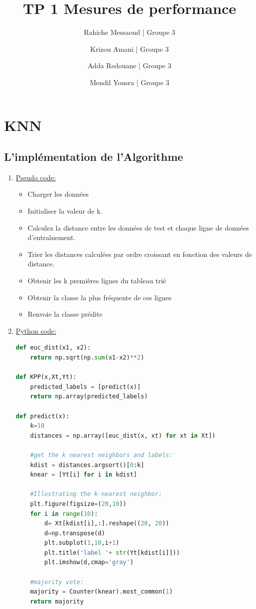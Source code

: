 \documentclass[12pt,a4paper]{article}
\title{TP 1 Mesures de performance}
\author{Rahiche Messaoud | Groupe 3 \and Krizou Amani | Groupe 3 \and Adda Redouane | Groupe 3 \and Mendil Yousra | Groupe 3 }
\date{ }
\begin{document}
\maketitle
\newpage
\tableofcontents

\newpage
\section{KNN}
\subsection{L'implémentation de l'Algorithme}
\begin{enumerate}
\item \underline{Pseudo code:}
	\begin{itemize}
	\item Charger les données
	\item Initialiser la valeur de k.
	\item Calculez la distance entre les données de test et chaque ligne de données d'entraînement.
	\item Trier les distances calculées par ordre croissant en fonction des valeurs de distance.
	\item Obtenir les k premières lignes du tableau trié
	\item Obtenir la classe la plus fréquente de ces lignes
	\item Renvoie la classe prédite
	\end{itemize}
\item \underline{Python code:}
\begin{lstlisting}[language=Python]
def euc_dist(x1, x2):
    return np.sqrt(np.sum(x1-x2)**2)

def KPP(x,Xt,Yt):
    predicted_labels = [predict(x)]
    return np.array(predicted_labels)

def predict(x):
    k=10
    distances = np.array([euc_dist(x, xt) for xt in Xt])
    
    #get the k nearest neighbors and labels:
    kdist = distances.argsort()[0:k]
    knear = [Yt[i] for i in kdist]
    
    #Illustrating the k-nearest neighbor:
    plt.figure(figsize=(20,10))
    for i in range(10):
        d= Xt[kdist[i],:].reshape((20, 20))
        d=np.transpose(d)
        plt.subplot(1,10,i+1)
        plt.title('label '+ str(Yt[kdist[i]]))
        plt.imshow(d,cmap='gray')
        
    #majority vote:
    majority = Counter(knear).most_common(1)
    return majority
\end{lstlisting}

\end{enumerate}
\end{document}
